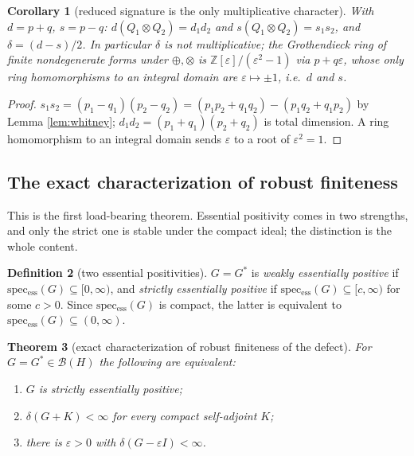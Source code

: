 \documentclass[11pt,reqno]{amsart}
\newtheorem{theorem}{Theorem}[section]
\newtheorem{corollary}[theorem]{Corollary}
\theoremstyle{definition}
\newtheorem{definition}[theorem]{Definition}
\newcommand{\specess}{\operatorname{spec_{ess}}}
\newcommand{\Z}{\mathbb{Z}}
\begin{document}
\begin{corollary}[reduced signature is the only multiplicative character]
\label{cor:character}
With \(d=p+q\), \(s=p-q\): \(d(Q_1\otimes Q_2)=d_1d_2\) and
\(s(Q_1\otimes Q_2)=s_1s_2\), and \(\delta=(d-s)/2\). In particular
\(\delta\) is not multiplicative; the Grothendieck ring of finite nondegenerate
forms under \(\oplus,\otimes\) is \(\Z[\varepsilon]/(\varepsilon^2-1)\) via
\(p+q\varepsilon\), whose only ring homomorphisms to an integral domain are
\(\varepsilon\mapsto\pm1\), i.e.\ \(d\) and \(s\).
\end{corollary}

\begin{proof}
\(s_1s_2=(p_1-q_1)(p_2-q_2)=(p_1p_2+q_1q_2)-(p_1q_2+q_1p_2)\) by Lemma
\ref{lem:whitney}; \(d_1d_2=(p_1+q_1)(p_2+q_2)\) is total dimension. A ring
homomorphism to an integral domain sends \(\varepsilon\) to a root of
\(\varepsilon^2=1\).
\end{proof}

\subsection{The exact characterization of robust finiteness}
This is the first load-bearing theorem. Essential positivity comes in two
strengths, and only the strict one is stable under the compact ideal; the
distinction is the whole content.

\begin{definition}[two essential positivities]\label{def:two-pos}
\(G=G^*\) is \emph{weakly essentially positive} if
\(\specess(G)\subseteq[0,\infty)\), and \emph{strictly essentially positive} if
\(\specess(G)\subseteq[c,\infty)\) for some \(c>0\). Since \(\specess(G)\) is
compact, the latter is equivalent to \(\specess(G)\subseteq(0,\infty)\).
\end{definition}

\begin{theorem}[exact characterization of robust finiteness of the defect]
\label{thm:exact}
For \(G=G^*\in\mathcal B(H)\) the following are equivalent:
\begin{enumerate}
\item[\textup{(i)}] \(G\) is strictly essentially positive;
\item[\textup{(ii)}] \(\delta(G+K)<\infty\) for \emph{every} compact
self-adjoint \(K\);
\item[\textup{(iii)}] there is \(\varepsilon>0\) with
\(\delta(G-\varepsilon I)<\infty\).
\end{enumerate}
\end{theorem}
\end{document}
